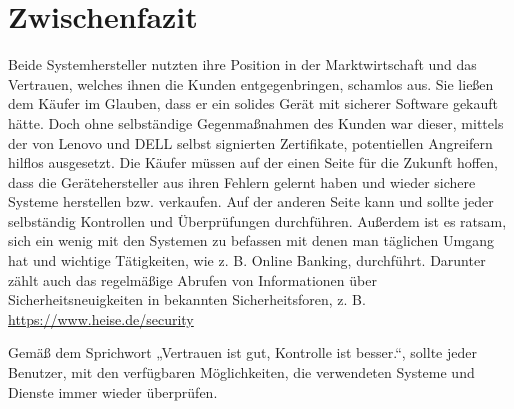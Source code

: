 \section{Zwischenfazit}
Beide Systemhersteller nutzten ihre Position in der Marktwirtschaft und das Vertrauen, welches ihnen die Kunden entgegenbringen, schamlos aus. Sie ließen dem Käufer im Glauben, dass er ein solides Gerät mit sicherer Software gekauft hätte. Doch ohne selbständige Gegenmaßnahmen des Kunden war dieser, mittels der von Lenovo und DELL selbst signierten Zertifikate, potentiellen Angreifern hilflos ausgesetzt. Die Käufer müssen auf der einen Seite für die Zukunft hoffen, dass die Gerätehersteller aus ihren Fehlern gelernt haben und wieder sichere Systeme herstellen bzw. verkaufen. Auf der anderen Seite kann und sollte jeder selbständig Kontrollen und Überprüfungen durchführen. Außerdem ist es ratsam, sich ein wenig mit den Systemen zu befassen mit denen man täglichen Umgang hat und wichtige Tätigkeiten, wie z. B. Online Banking, durchführt. Darunter zählt auch das regelmäßige Abrufen von Informationen über Sicherheitsneuigkeiten in bekannten Sicherheitsforen, z. B. \url{https://www.heise.de/security}

Gemäß dem Sprichwort „Vertrauen ist gut, Kontrolle ist besser.“, sollte jeder Benutzer, mit den verfügbaren Möglichkeiten, die verwendeten Systeme und Dienste immer wieder überprüfen.